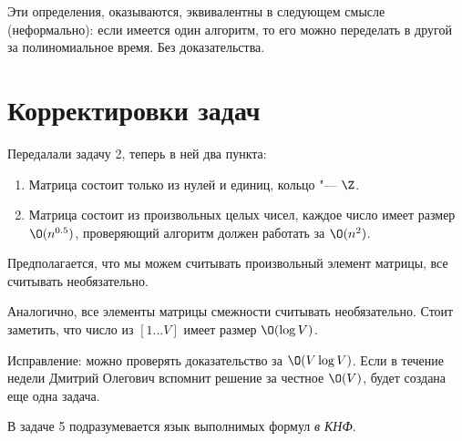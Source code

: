 \begin{Rem}
	Эти определения, оказываются, эквивалентны в следующем смысле (неформально):
	если имеется один алгоритм, то его можно переделать в другой за полиномиальное время.
	Без доказательства.
\end{Rem}

\section{Корректировки задач}
	Передалали задачу 2, теперь в ней два пункта:
	\begin{enumerate}
		\item Матрица состоит только из нулей и единиц, кольцо "--- $\Z$.
		\item
			Матрица состоит из произвольных целых чисел, каждое число имеет размер $\O(n^{0.5})$,
			проверяющий алгоритм должен работать за $\O(n^2)$.
	\end{enumerate}
	Предполагается, что мы можем считывать произвольный элемент матрицы, все считывать необязательно.

	Аналогично, все элементы матрицы смежности считывать необязательно.
	Стоит заметить, что число из $[1\dots V]$ имеет размер $\O(\log V)$.

	Исправление: можно проверять доказательство за $\O(V \log V)$.
	Если в течение недели Дмитрий Олегович вспомнит решение за честное $\O(V)$, будет создана еще одна задача.

	В задаче 5 подразумевается язык выполнимых формул \textit{в КНФ}.
